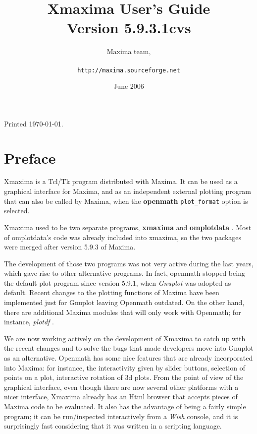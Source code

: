 \documentclass[12pt,makeidx,maxima]{book}
\begin{document}
\frontmatter
\title{Xmaxima User's Guide\\
	Version 5.9.3.1cvs}

\author{Maxima team,\\
        \ \\
	{\tt http://maxima.sourceforge.net}
        }

\date{June 2006}

\maketitle

\pagestyle{empty}
\clearpage
\vspace*{5in}
Printed \today.
\clearpage

\pagestyle{headings}
\tableofcontents
\clearpage

\chapter{Preface}
Xmaxima is a  Tcl/Tk program distributed with 
Maxima. It can be used as a graphical interface for Maxima, and as an
independent external plotting program that can also be called by Maxima,
when the  \textbf{openmath} \texttt{plot\_format} option is
selected.

Xmaxima used to be two separate programs, \textbf{xmaxima} and
\textbf{omplotdata} . Most of omplotdata's code was
already included into xmaxima, so the two packages were merged after
version 5.9.3 of Maxima.

The development of those two programs was not very active during the last
years, which gave rise to other alternative programs. In fact, openmath
stopped being the default plot program since version 5.9.1, when
 \emph{Gnuplot} was adopted as default. Recent changes to
the plotting functions of Maxima have been implemented just for Gnuplot
leaving Openmath outdated. On the other hand, there are additional Maxima
modules that will only work with Openmath; for instance, \emph{plotdf}
.

We are now working actively on the development of Xmaxima to catch up with
the recent changes and to solve the bugs that made developers move into
Gnuplot as an alternative. Openmath has some nice features that are already
incorporated into Maxima: for instance, the interactivity given by slider
buttons, selection of points on a plot, interactive rotation of 3d plots.
From the point of view of the graphical interface, even though there are
now several other platforms with a nicer interface, Xmaxima already has an
Html browser that accepts pieces of Maxima code to be evaluated. It also
has the advantage of being a fairly simple program; it can be run/inspected
interactively from a \emph{Wish}  console, and it is
surprisingly fast considering that it was written in a scripting language.
\end{document}
